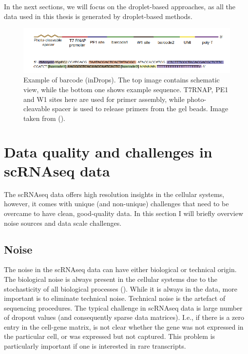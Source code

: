 In the next sections, we will focus on the droplet-based approaches,
as all the data used in this thesis is generated by droplet-based methods.

\begin{figure}
  \centering
  \includegraphics[width=\linewidth]{images/primer.png}
  \caption{Example of barcode (inDrops). The top image contains schematic view, while the bottom one shows example sequence.
           T7RNAP, PE1 and W1 sites here are used for primer assembly,
           while photo-cleavable spacer is used to release primers from the gel beads. Image taken from (\cite{Klein2015}).}
  \label{fig:primer}
\end{figure}

\section{Data quality and challenges in scRNAseq data}

The scRNAseq data offers high resolution insights in the cellular systems, however,
it comes with unique (and non-unique) challenges that need to be overcame to have clean, good-quality data.
In this section I will briefly overview noise sources and data scale challenges.

\subsection{Noise}

The noise in the scRNAseq data can have either biological or technical origin.
The biological noise is always present in the cellular systems due to the stochasticity of all biological processes (\cite{Vaz2017}).
While it is always in the data, more important is to eliminate technical noise.
Technical noise is the artefact of sequencing procedures.
The typical challenge in scRNAseq data is large number of dropout values (and consequently sparse data matrices).
I.e., if there is a zero entry in the cell-gene matrix, is not clear whether the gene was not expressed in the particular cell,
or was expressed but not captured.
This problem is particularly important if one is interested in rare transcripts.

